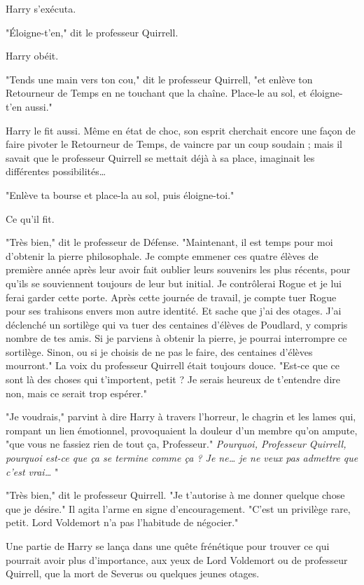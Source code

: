 Harry s'exécuta.

"Éloigne-t'en," dit le professeur Quirrell.

Harry obéit.

"Tends une main vers ton cou," dit le professeur Quirrell, "et enlève ton Retourneur de Temps en ne touchant que la chaîne. Place-le au sol, et éloigne-t'en aussi."

Harry le fit aussi. Même en état de choc, son esprit cherchait encore une façon de faire pivoter le Retourneur de Temps, de vaincre par un coup soudain ; mais il savait que le professeur Quirrell se mettait déjà à sa place, imaginait les différentes possibilités…

"Enlève ta bourse et place-la au sol, puis éloigne-toi."

Ce qu'il fit.

"Très bien," dit le professeur de Défense. "Maintenant, il est temps pour moi d'obtenir la pierre philosophale. Je compte emmener ces quatre élèves de première année après leur avoir fait oublier leurs souvenirs les plus récents, pour qu'ils se souviennent toujours de leur but initial. Je contrôlerai Rogue et je lui ferai garder cette porte. Après cette journée de travail, je compte tuer Rogue pour ses trahisons envers mon autre identité. Et sache que j'ai des otages. J'ai déclenché un sortilège qui va tuer des centaines d'élèves de Poudlard, y compris nombre de tes amis. Si je parviens à obtenir la pierre, je pourrai interrompre ce sortilège. Sinon, ou si je choisis de ne pas le faire, des centaines d'élèves mourront." La voix du professeur Quirrell était toujours douce. "Est-ce que ce sont là des choses qui t'importent, petit ? Je serais heureux de t'entendre dire non, mais ce serait trop espérer."

"Je voudrais," parvint à dire Harry à travers l'horreur, le chagrin et les lames qui, rompant un lien émotionnel, provoquaient la douleur d'un membre qu'on ampute, "que vous ne fassiez rien de tout ça, Professeur." \emph{Pourquoi, Professeur Quirrell, pourquoi est-ce que ça se termine comme ça ? Je ne… je ne veux pas admettre que c'est vrai…} "

"Très bien," dit le professeur Quirrell. "Je t'autorise à me donner quelque chose que je désire." Il agita l'arme en signe d'encouragement. "C'est un privilège rare, petit. Lord Voldemort n'a pas l'habitude de négocier."

Une partie de Harry se lança dans une quête frénétique pour trouver ce qui pourrait avoir plus d'importance, aux yeux de Lord Voldemort ou de professeur Quirrell, que la mort de Severus ou quelques jeunes otages.

